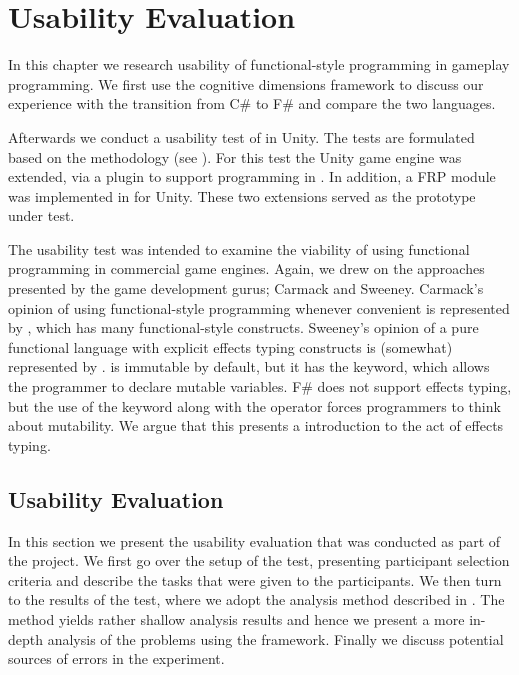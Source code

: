 \chapter{Usability Evaluation}
In this chapter we research usability of functional-style programming in gameplay programming. We first use the cognitive dimensions framework to discuss our experience with the transition from C\# to F\# and compare the two languages.

Afterwards we conduct a usability test of \fs in Unity. The tests are formulated based on the \champagne methodology (see ). For this test the Unity game engine was extended, via a plugin to support programming in \fs\cite{fsharp2019plugin}. In addition, a \gls{FRP} module was implemented in \fs for Unity. These two extensions served as the prototype under test.%

The usability test was intended to examine the viability of using functional programming in commercial game engines. Again, we drew on the approaches presented by the game development gurus; Carmack and Sweeney. Carmack's opinion of using functional-style programming whenever convenient is represented by \cs, which has many functional-style constructs. Sweeney's opinion of a pure functional language with explicit effects typing constructs is (somewhat) represented by \fs. \fs is immutable by default, but it has the  keyword, which allows the programmer to declare mutable variables. F\# does not support effects typing, but the use of the  keyword along with the \ttt{\textless-} operator forces programmers to think about mutability. We argue that this presents a  introduction to the act of effects typing.


\section{Usability Evaluation}
In this section we present the usability evaluation that was conducted as part of the project. We first go over the setup of the test, presenting participant selection criteria and describe the tasks that were given to the participants. We then turn to the results of the test, where we adopt the analysis method described in \champagne\cite{blackwell2004champagne}. The \champagne method yields rather shallow analysis results and hence we present a more in-depth analysis of the problems using the \cognitive framework. Finally we discuss potential sources of errors in the experiment.




